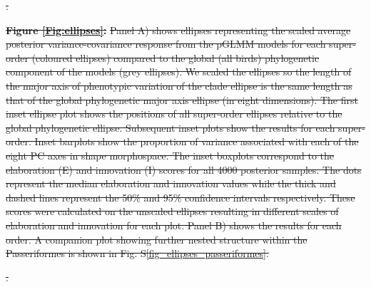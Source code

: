 \documentclass[12pt,letterpaper]{article}
\providecommand{\DIFdeltex}[1]{{\protect\color{red}\sout{#1}}}                      %
\providecommand{\DIFdelbegin}{} %
\providecommand{\DIFdelFL}[1]{\DIFdel{#1}} %
\providecommand{\DIFdel}[1]{\texorpdfstring{\DIFdeltex{#1}}{}} %
\newcommand{\DIFscaledelfig}{0.5}
\newlength{\DIFdelgraphicswidth} %
\newlength{\DIFdelgraphicsheight} %
\newcommand{\DIFdelincludegraphics}[2][]{%
\sbox{\DIFdelgraphicsbox}{\DIFOincludegraphics[#1]{#2}}%
\settoboxwidth{\DIFdelgraphicswidth}{\DIFdelgraphicsbox} %
\settoboxtotalheight{\DIFdelgraphicsheight}{\DIFdelgraphicsbox} %
\scalebox{\DIFscaledelfig}{%
\parbox[b]{\DIFdelgraphicswidth}{\usebox{\DIFdelgraphicsbox}\\[-\baselineskip] \rule{\DIFdelgraphicswidth}{0em}}\llap{\resizebox{\DIFdelgraphicswidth}{\DIFdelgraphicsheight}{%
\setlength{\unitlength}{\DIFdelgraphicswidth}%
\begin{picture}(1,1)%
\thicklines\linethickness{2pt} %
{\color[rgb]{1,0,0}\put(0,0){\framebox(1,1){}}}%
{\color[rgb]{1,0,0}\put(0,0){\line( 1,1){1}}}%
{\color[rgb]{1,0,0}\put(0,1){\line(1,-1){1}}}%
\end{picture}%
}\hspace*{3pt}}} %
} %
\DeclareRobustCommand{\DIFdelbegin}{\DIFOdelbegin \let\includegraphics\DIFdelincludegraphics} %
\begin{document}
\DIFdelbegin %
{%
\DIFdelFL{.}}

\textbf{\DIFdel{Figure \ref{Fig:ellipses}:}}
\DIFdel{Panel A) shows ellipses representing the scaled average posterior variance-covariance response from the pGLMM models for each super-order (coloured ellipses) compared to the global (all birds) phylogenetic component of the models (grey ellipses).
We scaled the ellipses so the length of the major axis of phenotypic variation of the clade ellipse is the same length as that of the global phylogenetic major axis ellipse (in eight dimensions).
The first inset ellipse plot shows the positions of all super-order ellipses relative to the global phylogenetic ellipse.
Subsequent inset plots show the results for each super-order. 
Inset barplots show the proportion of variance associated with each of the eight PC axes in shape morphospace.
The inset boxplots correspond to the elaboration (E) and innovation (I) scores for all 4000 posterior samples.
The dots represent the median elaboration and innovation values while the thick and dashed lines represent the 50\% and 95\% confidence intervals respectively.
These scores were calculated on the unscaled ellipses resulting in different scales of elaboration and innovation for each plot.
Panel B) shows the results for each order.
A companion plot showing further nested structure within the Passeriformes is shown in Fig. S\ref{fig_ellipses_passeriformes}.
}%



{%
\DIFdelFL{.}}

\end{document}
